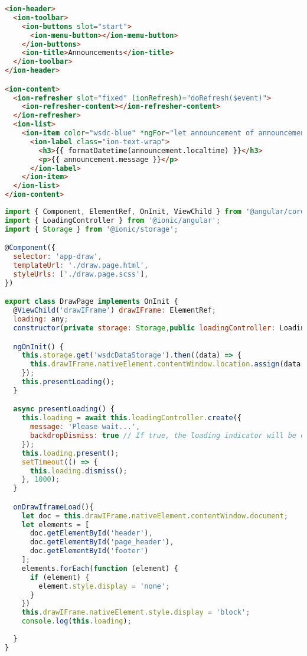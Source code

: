 \begin{lstlisting}[language=html, label={lst:announcements.page.html}, caption=annoncement.page.html]
<ion-header>
  <ion-toolbar>
    <ion-buttons slot="start">
      <ion-menu-button></ion-menu-button>
    </ion-buttons>
    <ion-title>Announcements</ion-title>
  </ion-toolbar>
</ion-header>

<ion-content>
  <ion-refresher slot="fixed" (ionRefresh)="doRefresh($event)">
    <ion-refresher-content></ion-refresher-content>
  </ion-refresher>
  <ion-list>
    <ion-item color="wsdc-blue" *ngFor="let announcement of announcements; let i = index">
      <ion-label class="ion-text-wrap">
        <h3>{{ formatDatetime(announcement.localtime) }}</h3>
        <p>{{ announcement.message }}</p>
      </ion-label>
    </ion-item>
  </ion-list>
</ion-content>
\end{lstlisting} 

\begin{lstlisting}[language=JavaScript, label={lst:draw.page.ts}, caption=draw.page.ts]
import { Component, ElementRef, OnInit, ViewChild } from '@angular/core';
import { LoadingController } from '@ionic/angular';
import { Storage } from '@ionic/storage';

@Component({
  selector: 'app-draw',
  templateUrl: './draw.page.html',
  styleUrls: ['./draw.page.scss'],
})

export class DrawPage implements OnInit {
  @ViewChild('drawIFrame') drawIFrame: ElementRef;
  loading: any;
  constructor(private storage: Storage,public loadingController: LoadingController) { }

  ngOnInit() {
    this.storage.get('wsdcDataStorage').then((data) => {
      this.drawIFrame.nativeElement.contentWindow.location.assign(data.draws);
    });
    this.presentLoading();
  }

  async presentLoading() {
    this.loading = await this.loadingController.create({
      message: 'Please wait...',
      backdropDismiss: true // If true, the loading indicator will be dismissed when the backdrop is clicked.
    });
    this.loading.present();
    setTimeout(() => {
      this.loading.dismiss();
    }, 1000);
  }

  onDrawIframeLoad(){
    let doc = this.drawIFrame.nativeElement.contentWindow.document;
    let elements = [
      doc.getElementById('header'),
      doc.getElementById('page_header'),
      doc.getElementById('footer')
    ];
    elements.forEach(function (element) {
      if (element) {
        element.style.display = 'none';
      }
    })
    this.drawIFrame.nativeElement.style.display = 'block';
    console.log(this.loading);
    
  }
}
\end{lstlisting} 

